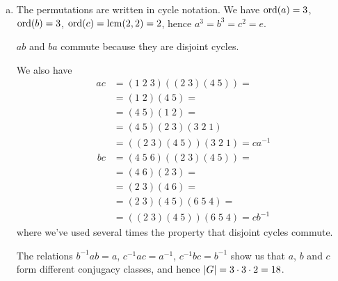 \begin{solution}
\begin{enumerate}[(a)]
    \item The permutations are written in cycle notation. We have \(\operatorname*{ord}(a) = 3\), \(\operatorname*{ord}(b) = 3\), \(\operatorname*{ord}(c) = \operatorname*{lcm}(2, 2) = 2\), hence \(a^3 = b^3 = c^2 = e\).
    
    \(ab\) and \(ba\) commute because they are disjoint cycles.
    
    We also have
    \begin{align*}
        ac &= (1 \; 2 \; 3) ((2 \; 3) (4 \; 5)) = \\
        &= (1 \; 2) (4 \; 5) = \\
        &= (4 \; 5) (1 \; 2) = \\ 
        &= (4 \; 5) (2 \; 3) (3 \; 2 \; 1) \\
        &= ((2 \; 3) (4 \; 5)) (3 \; 2 \; 1) = c a^{-1}
    \end{align*}
    \begin{align*}
        bc &= (4 \; 5 \; 6) ((2 \; 3) (4 \; 5)) = \\
        &= (4 \; 6) (2 \; 3) = \\
        &= (2 \; 3) (4 \; 6) = \\
        &= (2 \; 3) (4 \; 5) (6 \; 5 \; 4) = \\
        &= ((2 \; 3) (4 \; 5)) (6 \; 5 \; 4) = c b^{-1}
    \end{align*}
    where we've used several times the property that disjoint cycles commute.
    
    The relations \(b^{-1} a b = a\), \(c^{-1} a c = a^{-1}\), \(c^{-1} b c = b^{-1}\) show us that \(a\), \(b\) and \(c\) form different conjugacy classes, and hence \(\left|G\right| = 3 \cdot 3 \cdot 2 = 18\).
    

\end{enumerate}
\end{solution}
